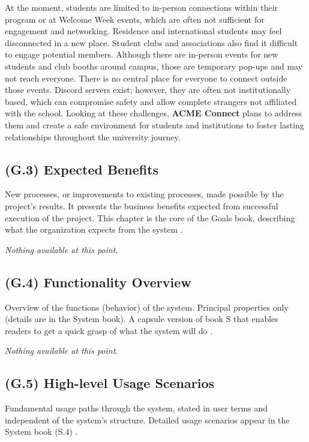 \documentclass[12pt,letterpaper]{article}
\begin{document}
At the moment, students are limited to in-person connections within their program or at Welcome Week events, which are often not sufficient for engagement and networking. Residence and international students may feel disconnected in a new place. Student clubs and associations also find it difficult to engage potential members. Although there are in-person events for new students and club booths around campus, those are temporary pop-ups and may not reach everyone. There is no central place for everyone to connect outside those events. Discord servers exist; however, they are often not institutionally based, which can compromise safety and allow complete strangers not affiliated with the school. Looking at these challenges, \textbf{ACME Connect} plans to address them and create a safe environment for students and institutions to foster lasting relationships throughout the university journey.

\subsection{(G.3) Expected Benefits}
New processes, or improvements to existing processes, made possible by the project’s results. It presents the business benefits expected from successful execution of the project. This chapter is the core of the Goals book, describing what the organization expects from the system \cite{meyer2022}.

\textit{Nothing available at this point.}

\subsection{(G.4) Functionality Overview}
Overview of the functions (behavior) of the system. Principal properties only (details are in the System book). A capsule version of book S that enables readers to get a quick grasp of what the system will do \cite{meyer2022}.

\textit{Nothing available at this point.}

\subsection{(G.5) High-level Usage Scenarios}
Fundamental usage paths through the system, stated in user terms and independent of the system’s structure. Detailed usage scenarios appear in the System book (S.4) \cite{meyer2022}.

\begin{center}
\end{center}
\end{document}

